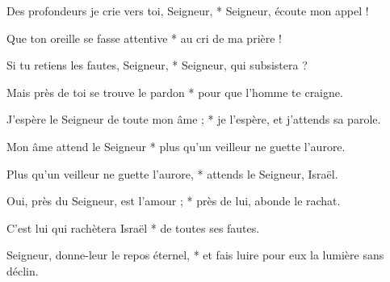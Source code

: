 \item Des profondeurs je crie vers toi, Seigneur, * Seigneur, écoute mon appel !

\item Que ton oreille se fasse attentive * au cri de ma prière !

\item Si tu retiens les fautes, Seigneur, * Seigneur, qui subsistera ?

\item Mais près de toi se trouve le pardon * pour que l'homme te craigne.

\item J'espère le Seigneur de toute mon âme ; * je l'espère, et j'attends sa parole.

\item Mon âme attend le Seigneur * plus qu'un veilleur ne guette l'aurore.

\item Plus qu'un veilleur ne guette l'aurore, * attends le Seigneur, Israël.

\item Oui, près du Seigneur, est l'amour ; * près de lui, abonde le rachat.

\item C'est lui qui rachètera Israël * de toutes ses fautes.

\item Seigneur, donne-leur le repos éternel, * et fais luire pour eux la lumière sans déclin.